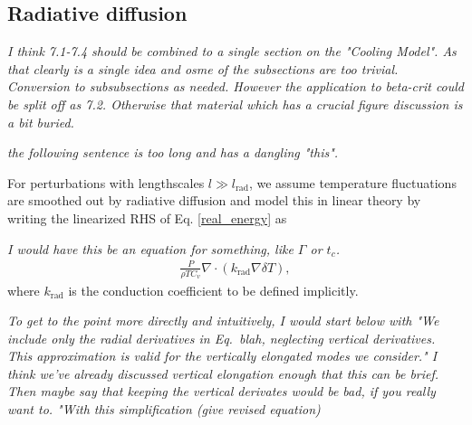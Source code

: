 \subsection{Radiative diffusion}
\emph{I think 7.1-7.4 should be combined to a single section on the "Cooling Model".  As that clearly is a single idea and osme of the subsections are too trivial. Conversion to subsubsections as needed. However the application to beta-crit could be split off as 7.2.  Otherwise that material which has a crucial figure discussion is a bit buried.} 

\emph{the following sentence is too long and has a dangling "this".}

For perturbations with lengthscales $l\gg
l_\mathrm{rad}$, we assume temperature fluctuations are smoothed out
by radiative diffusion and model this in linear theory by writing the
linearized RHS of Eq. \ref{real_energy} as 

\emph{I would have this be an equation for something, like $\Gamma$ or $t_c$.}
\begin{align}\label{diff_cool_proper}
  \frac{P}{\rho T C_v} \nabla\cdot\left(k_\mathrm{rad}\nabla\delta
    T\right),  
\end{align}
where $k_\mathrm{rad}$ is the conduction coefficient to be defined
implicitly. 

\emph{To get to the point more directly and intuitively, I would start below with "We include only the radial derivatives in Eq.\ blah, neglecting vertical derivatives.  This approximation is valid for the vertically elongated modes we consider."  I think we've already discussed vertical elongation enough that this can be brief.  Then maybe say that keeping the vertical derivates would be bad, if you really want to.  "With this simplification (give revised equation)}


